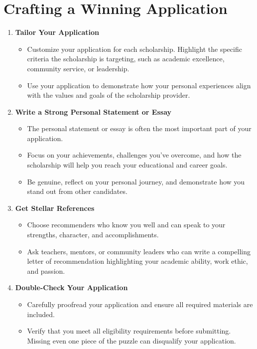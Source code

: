 \documentclass[
  letterpaper,
  DIV=11,
  numbers=noendperiod]{scrreprt}
\providecommand{\tightlist}{%
  \setlength{\itemsep}{0pt}\setlength{\parskip}{0pt}}\usepackage{longtable,booktabs,array}
\begin{document}
\section{Crafting a Winning
Application}\label{crafting-a-winning-application}

\begin{enumerate}
\def\labelenumi{\arabic{enumi}.}
\item
  \textbf{Tailor Your Application}

  \begin{itemize}
  \tightlist
  \item
    Customize your application for each scholarship. Highlight the
    specific criteria the scholarship is targeting, such as academic
    excellence, community service, or leadership.
  \item
    Use your application to demonstrate how your personal experiences
    align with the values and goals of the scholarship provider.
  \end{itemize}
\item
  \textbf{Write a Strong Personal Statement or Essay}

  \begin{itemize}
  \tightlist
  \item
    The personal statement or essay is often the most important part of
    your application.
  \item
    Focus on your achievements, challenges you've overcome, and how the
    scholarship will help you reach your educational and career goals.
  \item
    Be genuine, reflect on your personal journey, and demonstrate how
    you stand out from other candidates.
  \end{itemize}
\item
  \textbf{Get Stellar References}

  \begin{itemize}
  \tightlist
  \item
    Choose recommenders who know you well and can speak to your
    strengths, character, and accomplishments.
  \item
    Ask teachers, mentors, or community leaders who can write a
    compelling letter of recommendation highlighting your academic
    ability, work ethic, and passion.
  \end{itemize}
\item
  \textbf{Double-Check Your Application}

  \begin{itemize}
  \tightlist
  \item
    Carefully proofread your application and ensure all required
    materials are included.
  \item
    Verify that you meet all eligibility requirements before submitting.
    Missing even one piece of the puzzle can disqualify your
    application.
  \end{itemize}
\end{enumerate}
\end{document}
